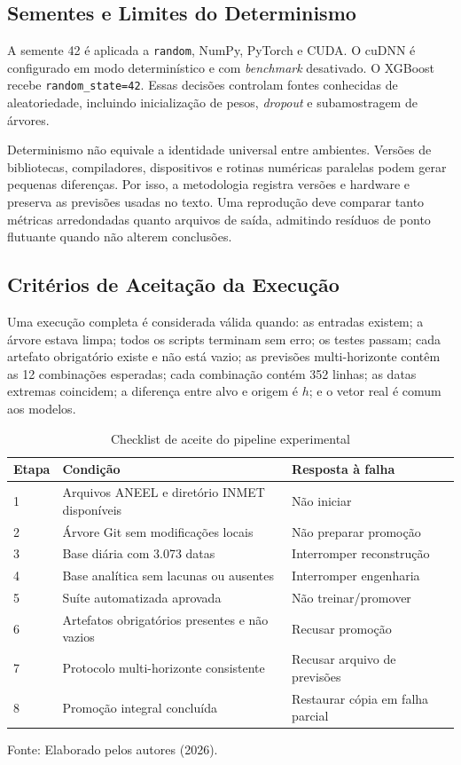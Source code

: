 \subsection{Sementes e Limites do Determinismo}

A semente 42 é aplicada a \texttt{random}, NumPy, PyTorch e CUDA. O cuDNN é configurado em modo determinístico e com \textit{benchmark} desativado. O XGBoost recebe \texttt{random\_state=42}. Essas decisões controlam fontes conhecidas de aleatoriedade, incluindo inicialização de pesos, \textit{dropout} e subamostragem de árvores.

Determinismo não equivale a identidade universal entre ambientes. Versões de bibliotecas, compiladores, dispositivos e rotinas numéricas paralelas podem gerar pequenas diferenças. Por isso, a metodologia registra versões e hardware e preserva as previsões usadas no texto. Uma reprodução deve comparar tanto métricas arredondadas quanto arquivos de saída, admitindo resíduos de ponto flutuante quando não alterem conclusões.

\subsection{Critérios de Aceitação da Execução}

Uma execução completa é considerada válida quando: as entradas existem; a árvore estava limpa; todos os scripts terminam sem erro; os testes passam; cada artefato obrigatório existe e não está vazio; as previsões multi-horizonte contêm as 12 combinações esperadas; cada combinação contém 352 linhas; as datas extremas coincidem; a diferença entre alvo e origem é $h$; e o vetor real é comum aos modelos.

\begin{table}[H]
\centering
\caption{Checklist de aceite do pipeline experimental}
\label{tab:checklist_aceite_pipeline}
\small
\begin{tabularx}{\textwidth}{p{1.25cm} X p{3.55cm}}
\toprule
\textbf{Etapa} & \textbf{Condição} & \textbf{Resposta à falha} \\
\midrule
1 & Arquivos ANEEL e diretório INMET disponíveis & Não iniciar \\
2 & Árvore Git sem modificações locais & Não preparar promoção \\
3 & Base diária com 3.073 datas & Interromper reconstrução \\
4 & Base analítica sem lacunas ou ausentes & Interromper engenharia \\
5 & Suíte automatizada aprovada & Não treinar/promover \\
6 & Artefatos obrigatórios presentes e não vazios & Recusar promoção \\
7 & Protocolo multi-horizonte consistente & Recusar arquivo de previsões \\
8 & Promoção integral concluída & Restaurar cópia em falha parcial \\
\bottomrule
\end{tabularx}
\small{Fonte: Elaborado pelos autores (2026).}
\end{table}

